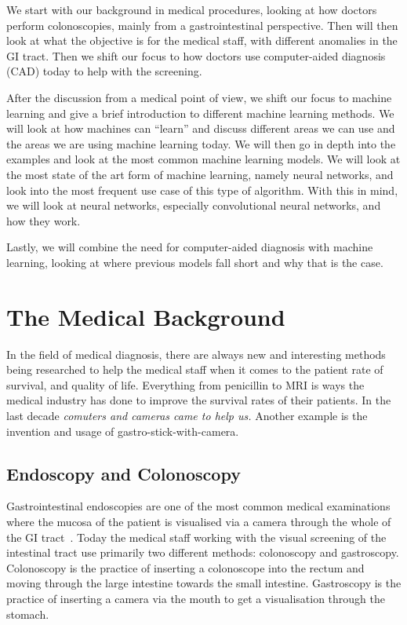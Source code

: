 We start with our background in medical procedures, looking at how doctors perform colonoscopies, mainly from a gastrointestinal perspective.
Then will then look at what the objective is for the medical staff, with different anomalies in the GI tract. Then we shift our focus to how doctors use computer-aided diagnosis (CAD) today to help with the screening. 

After the discussion from a medical point of view, we shift our focus to machine learning and give a brief introduction to different machine learning methods. We will look at how machines can ``learn'' and discuss different areas we can use and the areas we are using machine learning today. We will then go in depth into the examples and look at the most common machine learning models. We will look at the most state of the art form of machine learning, namely neural networks, and look into the most frequent use case of this type of algorithm.
With this in mind, we will look at neural networks, especially convolutional neural networks, and how they work.

Lastly, we will combine the need for computer-aided diagnosis with machine learning, looking at where previous models fall short and why that is the case.

\section{The Medical Background}
In the field of medical diagnosis, there are always new and interesting methods being researched to help the medical staff when it comes to the patient rate of survival, and quality of life. 
Everything from penicillin to MRI is ways the medical industry has done to improve the survival rates of their patients. 
In the last decade \textit{comuters and cameras came to help us.}
Another example is the invention and usage of gastro-stick-with-camera.


\subsection{Endoscopy and Colonoscopy}
Gastrointestinal endoscopies are one of the most common medical examinations where the mucosa of the patient is visualised via a camera through the whole of the GI tract~\cite{Holme13}.
Today the medical staff working with the visual screening of the intestinal tract use primarily two different methods: colonoscopy and gastroscopy. 
Colonoscopy is the practice of inserting a colonoscope into the rectum and moving through the large intestine towards the small intestine.  Gastroscopy is the practice of inserting a camera via the mouth to get a visualisation through the stomach.

